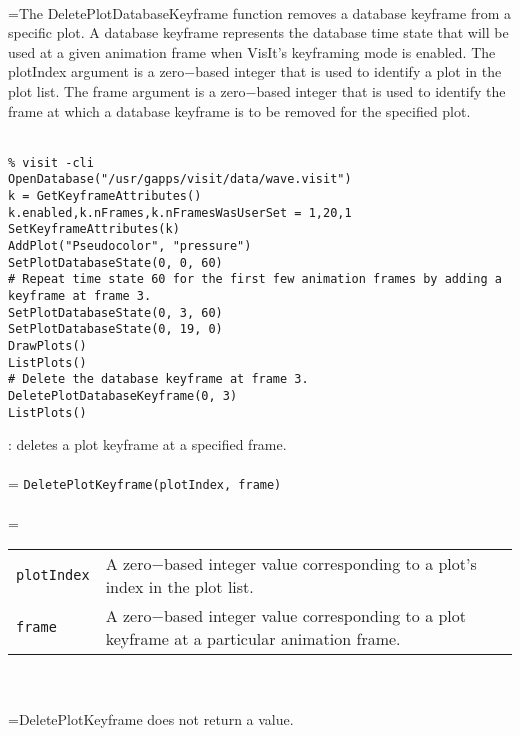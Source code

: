 \documentclass[10pt,a4paper]{report}
\begin{document}
 \\ 
\hangindent=\parindent The DeletePlotDatabaseKeyframe function removes a database keyframe from a specific plot. A database keyframe represents the database time state that will be used at a given animation frame when VisIt's keyframing mode is enabled. The plotIndex argument is a zero$-$based integer that is used to identify a plot in the plot list. The frame argument is a zero$-$based integer that is used to identify the frame at which a database keyframe is to be removed for the specified plot. \\[-3mm] 

\\[-6mm]
\begin{verbatim}% visit -cli
OpenDatabase("/usr/gapps/visit/data/wave.visit")
k = GetKeyframeAttributes()
k.enabled,k.nFrames,k.nFramesWasUserSet = 1,20,1
SetKeyframeAttributes(k)
AddPlot("Pseudocolor", "pressure")
SetPlotDatabaseState(0, 0, 60)
# Repeat time state 60 for the first few animation frames by adding a
keyframe at frame 3.
SetPlotDatabaseState(0, 3, 60)
SetPlotDatabaseState(0, 19, 0)
DrawPlots()
ListPlots()
# Delete the database keyframe at frame 3.
DeletePlotDatabaseKeyframe(0, 3)
ListPlots()
\end{verbatim}
\newpage


{}
: deletes a plot keyframe at a specified frame.\\[-3mm]

 \\ 
\hangindent=\parindent 
\verb!DeletePlotKeyframe(plotIndex, frame)!\\ [-3mm]

 \\ 
\hangindent=\parindent 
\begin{tabular}{lp{9cm}}
\verb!plotIndex! & A zero$-$based integer value corresponding to a plot's index in the plot list. \\
\verb!frame! & A zero$-$based integer value corresponding to a plot keyframe at a particular animation frame. \\
\end{tabular} \\[-2mm]


 \\ 
\hangindent=\parindent DeletePlotKeyframe does not return a value. \\[-3mm] 
\end{document}
